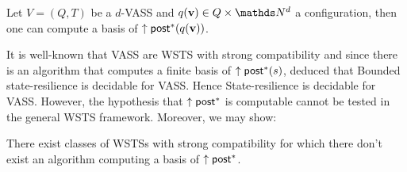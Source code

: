 \begin{proposition}
Let $V= (Q,T)$ be a $d$-VASS and $q(\textbf{v}) \in Q \times \N^d$ a configuration, then one can compute a basis of $\uparrow \textsf{post}^*(q(\textbf{v}))$.
\end{proposition}


\iffalse
\begin{proof}
By Proposition~\ref{post*}, a basis of $\uparrow \post^*(s)$ is computable for every state $s$ iff the downward-reachability problem is decidable.
Let us now show that the downward-reachability problem is decidable for Petri nets.
Let us consider a downward closed set $D$ in a Petri net.
Let us consider $B$ a basis of the upward-closed set $S \setminus D$.

$D$ is  defined by ... states where your number of counter is bounded by a constant (deduce this from ... having to be smaller than elements of the basis $B$), and others where it is unbounded. You have $m$ counters where it is bounded by $n$
then you have $m \times n$ possibilities for the values in these counters
you have unlimited possibilities for the values of the other counters,
but that is where the submarking problem comes in handy,
i.e. you ask the submarking problem for all of the $m \times n$ possibilities.

So downward-set reachability is decidable for PN.
\end{proof}
\fi

It is well-known that 
VASS are WSTS with strong compatibility and since there is an algorithm that computes a finite basis of  $\uparrow \post^*(s)$, \cite{DBLP:conf/gg/Ozkan22} deduced that {\sc Bounded state-resilience} is decidable for VASS.
Hence {\sc State-resilience} is decidable for %
VASS.
However, the hypothesis that $\uparrow \textsf{post}^*$ is computable cannot be tested in the general WSTS framework. Moreover, we may show:

\begin{proposition}
There exist classes of WSTSs with strong 
 compatibility for which there don't exist an algorithm computing a basis of $\uparrow \textsf{post}^*$.
\end{proposition}


